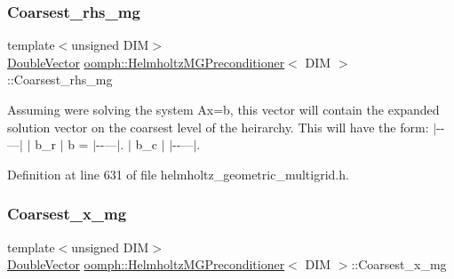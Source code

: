 \mbox{\label{classoomph_1_1HelmholtzMGPreconditioner_a592d08dd3b84f6818ba18913d72c3a1c}} 
\subsubsection{\texorpdfstring{Coarsest\+\_\+rhs\+\_\+mg}{Coarsest\_rhs\_mg}}
{\footnotesize\ttfamily template$<$unsigned D\+IM$>$ \\
\hyperlink{classoomph_1_1DoubleVector}{Double\+Vector} \hyperlink{classoomph_1_1HelmholtzMGPreconditioner}{oomph\+::\+Helmholtz\+M\+G\+Preconditioner}$<$ D\+IM $>$\+::Coarsest\+\_\+rhs\+\_\+mg\hspace{0.3cm}{\ttfamily [private]}}



Assuming we\textquotesingle{}re solving the system Ax=b, this vector will contain the expanded solution vector on the coarsest level of the heirarchy. This will have the form\+: $\vert$-\/-\/---$\vert$ $\vert$ b\+\_\+r $\vert$ b = $\vert$-\/-\/---$\vert$. $\vert$ b\+\_\+c $\vert$ $\vert$-\/-\/---$\vert$. 



Definition at line 631 of file helmholtz\+\_\+geometric\+\_\+multigrid.\+h.

\mbox{\label{classoomph_1_1HelmholtzMGPreconditioner_a931536210d5862f28bd7f84f1c880b8a}} 
\subsubsection{\texorpdfstring{Coarsest\+\_\+x\+\_\+mg}{Coarsest\_x\_mg}}
{\footnotesize\ttfamily template$<$unsigned D\+IM$>$ \\
\hyperlink{classoomph_1_1DoubleVector}{Double\+Vector} \hyperlink{classoomph_1_1HelmholtzMGPreconditioner}{oomph\+::\+Helmholtz\+M\+G\+Preconditioner}$<$ D\+IM $>$\+::Coarsest\+\_\+x\+\_\+mg\hspace{0.3cm}{\ttfamily [private]}}



